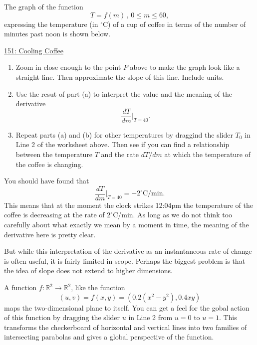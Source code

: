 \documentclass{ximera}
\begin{document}
\begin{example}  \label{Ex:KJDmft4thghhgdf}
The graph of the function 
\[
   T = f(m) \, ,  \, 0\leq m \leq 60,
\]
expressing the temperature (in $^\circ$C) of a cup of coffee in terms of the number of minutes past noon is shown below.

\begin{onlineOnly}
    \begin{center}
\end{center}
\end{onlineOnly}

\href{https://www.desmos.com/calculator/fuftb4mq0k}{151: Cooling Coffee}


\begin{enumerate}
\item Zoom in close enough to the point $P$ above to make the graph look like a straight line. Then approximate the slope of this line. Include units.

\item Use the resut of part (a) to interpret the value and the meaning of the derivative
\[
   \frac{dT}{dm} \Big|_{T=40} .
\]

\item Repeat parts (a) and (b) for other temperatures by draggind the slider $T_0$ in Line 2 of the worksheet above. Then see if you can find a relationship between the temperature $T$ and the rate $dT/dm$ at which the temperature of the coffee is changing. 

\end{enumerate}

You should have found that 
\[
    \frac{dT}{dm} \Big|_{T=40} = -2^\circ\text{C}/\text{min}.
\]
This means that at the moment the clock strikes 12:04pm the temperature of the coffee is decreasing at the rate of $2^\circ$C/min. As long as we do not think too carefully about what exactly we mean by a moment in time, the meaning of the derivative here is pretty clear.

But while this interpretation of the derivative as an instantaneous rate of change is often useful, it is fairly limited in scope. Perhaps the biggest problem is that the idea of slope does not extend to higher dimensions. %

\end{example}

A function $f:\mathbb{R}^2\to \mathbb{R}^2$, like the function
\[
  (u,v) = f(x,y) = (0.2(x^2-y^2) , 0.4xy) 
\]
maps the two-dimensional plane to itself. You can get a feel for the gobal action of this function by dragging the slider $u$ in Line 2 from $u=0$ to $u=1$. This transforms the checkerboard of horizontal and vertical lines into two families of intersecting parabolas and gives a global perspective of the function.
\end{document}
